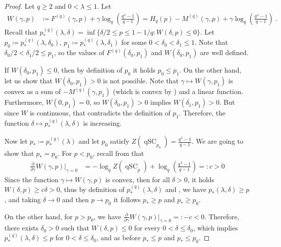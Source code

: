 \documentclass{article}
\DeclareMathOperator{\qSC}{qSC}
\theoremstyle{plain}
\theoremstyle{plain}
\theoremstyle{plain}
\theoremstyle{plain}
\theoremstyle{plain}
\theoremstyle{plain}
\theoremstyle{plain}
\theoremstyle{plain}
\theoremstyle{plain}
\theoremstyle{plain}
\theoremstyle{remark}
\theoremstyle{remark}
\theoremstyle{remark}
\theoremstyle{plain}
\begin{document}
\begin{proof}
    Let $q\ge 2$ and $0<\lambda\le 1$. Let
    \begin{align*}
    W(\gamma,p)&\coloneqq F^{(q)}(\gamma, p)+\gamma\log_q\left(\frac{q^{\lambda}-1}{q-1}\right)
    =H_q(p)-M^{(q)}(\gamma,p)+\gamma\log_q\left(\frac{q^{\lambda}-1}{q-1}\right)\;.
    \end{align*}
    Recall that $p_{*}^{(q)}(\lambda,\delta)
    =\inf\{\delta/2\le p\le 1-1/q: W(\delta, p)\le 0\}$. 
    Let $p_0\coloneqq p_{*}^{(q)}(\lambda,\delta_0)$, 
    $p_1\coloneqq p_{*}^{(q)}(\lambda,\delta_1)$
    for some $0<\delta_0<\delta_1\le 1$. Note that $\delta_0/2<\delta_1/2\le p_1$, so the values
    of $F^{(q)}(\delta_0,p_1)$ and $W(\delta_0,p_1)$
    are well defined.

    If $W(\delta_0,p_1)\le 0$, then
    by definition of $p_0$ it holds $p_0\le p_1$.
    On the other hand, let us show that $W(\delta_0,p_1)>0$
    is not possible.
    Note that $\gamma\mapsto W(\gamma,p_1)$ is convex as a sum of 
    $-M^{(q)}(\gamma,p_1)$ (which is convex by ) and a linear function.
    Furthermore, $W(0, p_1)=0$, so 
    $W(\delta_0,p_1)>0$ implies
    $W(\delta_1,p_1)> 0$.
    But since $W$ is continuous, that contradicts
    the definition of $p_1$. Therefore,
    the function $\delta\mapsto p_*^{(q)}(\lambda,\delta)$
    is increasing.

    Now let $p_*\coloneqq p_*^{(q)}(\lambda)$ and let $p_0$ satisfy $Z(\qSC_{p_0})=\frac{q^{\lambda}-1}{q-1}$. We are going to
    show that $p_*=p_0$.
    For $p<p_0$, recall from  that
    \begin{align*}
    \frac{\partial}{\partial\gamma}W(\gamma,p)\bigg\rvert_{\gamma=0}
    &=-\log_qZ(\qSC_p)+\log_q\left(\frac{q^{\lambda}-1}{q-1}\right)
    =: c>0
    \end{align*}
Since the function $\gamma\mapsto W(\gamma,p)$ is convex, then for all $\delta>0$, it holds $W(\delta,p)\ge c\delta>0$, thus by definition of $p_*^{(q)}(\lambda,\delta)$ and 
, we have $p_*(\lambda,\delta)\ge p$,
and taking $\delta\to 0$ and then $p\to p_0$ it follows $p_*\ge p$
and $p_*\ge p_0$.

On the other hand, for $p>p_0$, we have 
$\frac{\partial}{\partial\gamma}W(\gamma,p)\bigg\rvert_{\gamma=0}
=:-c<0$.
Therefore, there exists $\delta_0>0$ such that 
$W(\delta,p)\le 0$ for every $0<\delta\le\delta_0$,
which implies
$p_*^{(q)}(\lambda,\delta)\le p$ for $0<\delta\le\delta_0$,
and as before
$p_*\le p$ and $p_*\le p_0$.
\end{proof}
\end{document}
